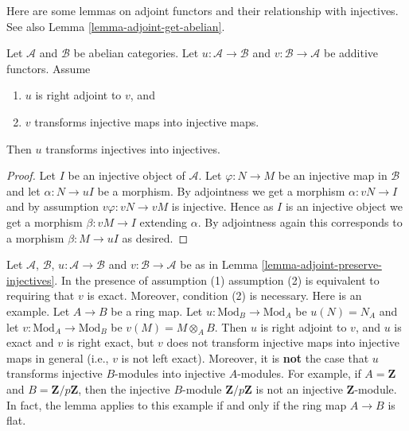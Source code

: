 \noindent
Here are some lemmas on adjoint functors and their relationship with
injectives. See also Lemma \ref{lemma-adjoint-get-abelian}.

\begin{lemma}
\label{lemma-adjoint-preserve-injectives}
Let $\mathcal{A}$ and $\mathcal{B}$ be abelian categories.
Let $u : \mathcal{A} \to \mathcal{B}$ and
$v : \mathcal{B} \to \mathcal{A}$ be additive functors. Assume
\begin{enumerate}
\item $u$ is right adjoint to $v$, and
\item $v$ transforms injective maps into injective maps.
\end{enumerate}
Then $u$ transforms injectives into injectives.
\end{lemma}

\begin{proof}
Let $I$ be an injective object of $\mathcal{A}$.
Let $\varphi : N \to M$ be an injective map in $\mathcal{B}$ and let
$\alpha : N \to uI$ be a morphism.
By adjointness we get a morphism $\alpha : vN \to I$ and
by assumption $v\varphi : vN \to vM$ is injective.
Hence as $I$ is an injective object we get a morphism
$\beta : vM \to I$ extending $\alpha$. By adjointness
again this corresponds to a morphism $\beta : M \to uI$ as
desired.
\end{proof}

\begin{remark}
\label{remark-need-left-exactness}
Let $\mathcal{A}$, $\mathcal{B}$, $u : \mathcal{A} \to \mathcal{B}$ and
$v : \mathcal{B} \to \mathcal{A}$ be as in
Lemma \ref{lemma-adjoint-preserve-injectives}.
In the presence of assumption (1) assumption (2) is equivalent to requiring
that $v$ is exact. Moreover, condition (2) is necessary. Here is an example.
Let $A \to B$ be a ring map.
Let $u : \text{Mod}_B \to \text{Mod}_A$ be $u(N) = N_A$
and let $v : \text{Mod}_A \to \text{Mod}_B$ be
$v(M) = M \otimes_A B$. Then $u$ is right adjoint to $v$, and $u$ is
exact and $v$ is right exact, but $v$ does not transform injective maps into
injective maps in general (i.e., $v$ is not left exact).
Moreover, it is {\bf not} the case that $u$ transforms injective
$B$-modules into injective $A$-modules. For example, if
$A = \mathbf{Z}$ and $B = \mathbf{Z}/p\mathbf{Z}$, then
the injective $B$-module $\mathbf{Z}/p\mathbf{Z}$ is not
an injective $\mathbf{Z}$-module. In fact, the lemma applies to this
example if and only if the ring map $A \to B$ is flat.
\end{remark}

